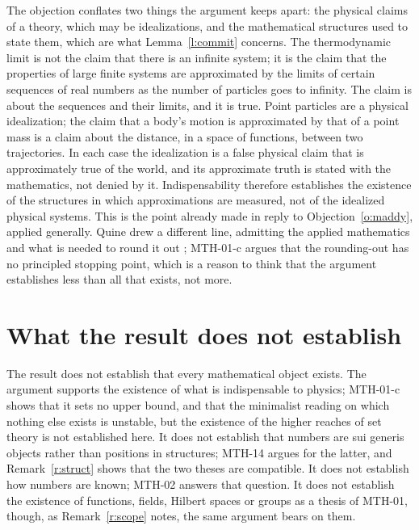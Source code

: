 \documentclass{situationist-preprint}
\begin{document}
\begin{reply}
The objection conflates two things the argument keeps apart: the physical claims of a theory, which may be idealizations, and the mathematical structures used to state them, which are what Lemma~\ref{l:commit} concerns. The thermodynamic limit is not the claim that there is an infinite system; it is the claim that the properties of large finite systems are approximated by the limits of certain sequences of real numbers as the number of particles goes to infinity. The claim is about the sequences and their limits, and it is true. Point particles are a physical idealization; the claim that a body's motion is approximated by that of a point mass is a claim about the distance, in a space of functions, between two trajectories. In each case the idealization is a false physical claim that is approximately true of the world, and its approximate truth is stated with the mathematics, not denied by it. Indispensability therefore establishes the existence of the structures in which approximations are measured, not of the idealized physical systems. This is the point already made in reply to Objection~\ref{o:maddy}, applied generally. Quine drew a different line, admitting the applied mathematics and what is needed to round it out \citep{Quine1986}; MTH-01-c argues that the rounding-out has no principled stopping point, which is a reason to think that the argument establishes less than all that exists, not more.
\end{reply}

\section{What the result does not establish}\label{s:not}

The result does not establish that every mathematical object exists. The argument supports the existence of what is indispensable to physics; MTH-01-c shows that it sets no upper bound, and that the minimalist reading on which nothing else exists is unstable, but the existence of the higher reaches of set theory is not established here. It does not establish that numbers are sui generis objects rather than positions in structures; MTH-14 argues for the latter, and Remark~\ref{r:struct} shows that the two theses are compatible. It does not establish how numbers are known; MTH-02 answers that question. It does not establish the existence of functions, fields, Hilbert spaces or groups as a thesis of MTH-01, though, as Remark~\ref{r:scope} notes, the same argument bears on them.
\end{document}
